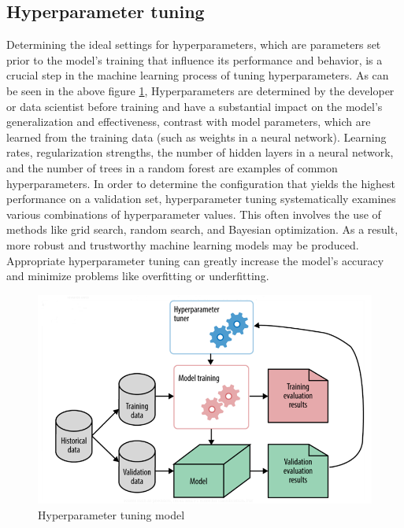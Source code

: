 \documentclass[a4paper,12pt]{report}%
\renewcommand{\\}{\vspace*{0.5\baselineskip} \newline}
\begin{document}
\subsection{Hyperparameter tuning}
Determining the ideal settings for hyperparameters, which are parameters set prior to the model's training that influence its performance and behavior, is a crucial step in the machine learning process of tuning hyperparameters. 
As can be seen in the above figure \ref{Hyperparameter tuning model}, Hyperparameters are determined by the developer or data scientist before training and have a substantial impact on the model's generalization and effectiveness, contrast with model parameters, which are learned from the training data (such as weights in a neural network). Learning rates, regularization strengths, the number of hidden layers in a neural network, and the number of trees in a random forest are examples of common hyperparameters. In order to determine the configuration that yields the highest performance on a validation set, hyperparameter tuning systematically examines various combinations of hyperparameter values.
This often involves the use of methods like grid search, random search, and Bayesian optimization. As a result, more robust and trustworthy machine learning models may be produced. Appropriate hyperparameter tuning can greatly increase the model's accuracy and minimize problems like overfitting or underfitting.

\begin{figure}[h]
\centering
	\includegraphics[scale=1.0]{images/hyperparameter tuning.png}\\
	\begin{footnotesize}
		\caption{Hyperparameter tuning model \cite{16}}
		\label{Hyperparameter tuning model}
	\end{footnotesize}
\end{figure}
\end{document}
